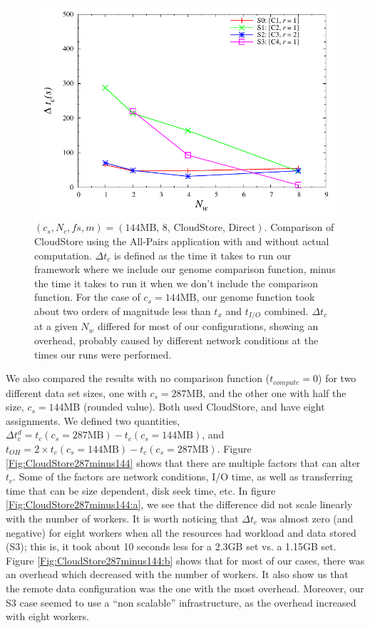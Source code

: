 \documentclass{rspublic}
\begin{document}
\begin{figure}
\begin{center}
\includegraphics[scale=0.5]{data/graphs/CloudStoreComputeMinusNoCompute144}
\caption{$(c_s, N_c, f\!s, m) = (\mbox{144MB, 8, CloudStore,
Direct})$. Comparison of CloudStore using the All-Pairs application with
and without actual computation. $\Delta t_c$ is defined as the time it
takes to run our framework where we include our genome comparison
function, minus the time it takes to run it when we don't include the
comparison function. For the case of $c_s=144\mbox{MB}$, our genome function
took about two orders of magnitude less than $t_x$ and $t_{I/O}$
combined. $\Delta t_c$ at a given $N_w$ differed for most of our
configurations, showing an overhead, probably caused by different
network conditions at the times our runs were performed.}
\label{Fig:experiment4}
\end{center}
\vspace{-0.3cm}
\end{figure}

We also compared the results with no comparison function
($t_{compute}=0$) for two different data set sizes, one with $c_s =
287\mbox{MB}$, and the other one with half the size, $c_s = 144\mbox{MB}$ (rounded
value). Both used CloudStore, and have eight assignments. We defined two
quantities, $\Delta t_c^d = t_c(c_s = 287\mbox{MB}) - t_c(c_s = 144\mbox{MB})$, and
$t_{OH} = 2 \times t_c(c_s = 144\mbox{MB}) - t_c(c_s = 287\mbox{MB})$. Figure
\ref{Fig:CloudStore287minus144} shows that there are multiple factors
that can alter $t_c$. Some of the factors are network conditions, I/O
time, as well as transferring time that can be size dependent, disk seek
time, etc. In figure \ref{Fig:CloudStore287minus144:a}, we see that the
difference did not scale linearly with the number of workers. It is
worth noticing that $\Delta t_c$ was almost zero (and negative) for
eight workers when all the resources had workload and data stored (S3);
this is, it took about 10 seconds less for a 2.3GB set vs. a 1.15GB
set. Figure \ref{Fig:CloudStore287minus144:b} shows
that for most of our cases, there was an overhead which decreased with
the number of workers. It also show us that the remote data
configuration was the one with the most overhead. Moreover, our S3 case
seemed to use a ``non scalable'' infrastructure, as the overhead
increased with eight workers.
\end{document}
